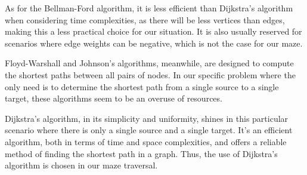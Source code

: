 As for the Bellman-Ford algorithm, it is less efficient than Dijkstra's algorithm when considering time complexities, as there will be less vertices than edges, making this a less practical choice for our situation. It is also usually reserved for scenarios where edge weights can be negative, which is not the case for our maze.

Floyd-Warshall and Johnson's algorithms, meanwhile, are designed to compute the shortest paths between all pairs of nodes. In our specific problem where the only need is to determine the shortest path from a single source to a single target, these algorithms seem to be an overuse of resources.

Dijkstra's algorithm, in its simplicity and uniformity, shines in this particular scenario where there is only a single source and a single target. It's an efficient algorithm, both in terms of time and space complexities, and offers a reliable method of finding the shortest path in a graph. Thus, the use of Dijkstra's algorithm is chosen in our maze traversal.